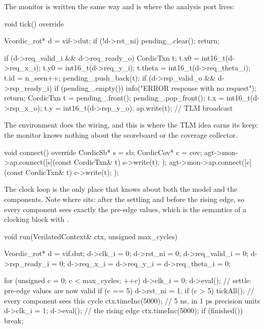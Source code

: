 The monitor is written the same way and is where the analysis port lives:

\begin{cppcode}[caption={The monitor publishes on the analysis port},label={lst:verilator:mon}]
void tick() override {
    Vcordic_rot* d = vif->dut;
    if (!d->rst_ni) { pending_.clear(); return; }

    if (d->req_valid_i && d->req_ready_o) {
        CordicTxn t;
        t.x0 = int16_t(d->req_x_i);
        t.y0 = int16_t(d->req_y_i);
        t.theta = int16_t(d->req_theta_i);
        t.id = n_seen++;
        pending_.push_back(t);
    }
    if (d->rsp_valid_o && d->rsp_ready_i) {
        if (pending_.empty()) { info("ERROR response with no request"); return; }
        CordicTxn t = pending_.front();
        pending_.pop_front();
        t.x = int16_t(d->rsp_x_o);
        t.y = int16_t(d->rsp_y_o);
        ap.write(t);                       // TLM broadcast
    }
}
\end{cppcode}

The environment does the wiring, and this is where the TLM idea earns its
keep: the monitor knows nothing about the scoreboard or the coverage
collector.

\begin{cppcode}
void connect() override {
    CordicSb*  s = sb;
    CordicCov* c = cov;
    agt->mon->ap.connect([s](const CordicTxn& t) { s->write(t); });
    agt->mon->ap.connect([c](const CordicTxn& t) { c->write(t); });
}
\end{cppcode}

The clock loop is the only place that knows about both the model and the
components. Note where  sits: after the settling
 and before the rising edge, so every component sees exactly the
pre-edge values, which is the semantics of a clocking block with
.

\begin{cppcode}[caption={The clock loop, in the test},label={lst:verilator:run}]
void run(VerilatedContext& ctx, unsigned max_cycles) {
    Vcordic_rot* d = vif.dut;
    d->clk_i = 0; d->rst_ni = 0;
    d->req_valid_i = 0; d->rsp_ready_i = 0;
    d->req_x_i = d->req_y_i = d->req_theta_i = 0;

    for (unsigned c = 0; c < max_cycles; ++c) {
        d->clk_i = 0;
        d->eval();                 // settle: pre-edge values are now valid
        if (c == 5) d->rst_ni = 1;
        if (c > 5) tickAll();      // every component sees this cycle
        ctx.timeInc(5000);         // 5 ns, in 1 ps precision units
        d->clk_i = 1;
        d->eval();                 // the rising edge
        ctx.timeInc(5000);
        if (finished()) break;
    }
}
\end{cppcode}

